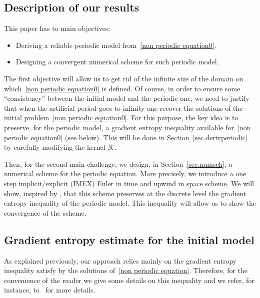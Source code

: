 \documentclass[11pt]{amsart}
\newcommand{\K}{\mathcal{K}}
\begin{document}
\subsection{Description of our results}\label{sec.description}

This paper has to main objectives:
\begin{itemize}
    \item Deriving a reliable periodic model from~\eqref{non periodic equation0}.
    \item Designing a convergent numerical scheme for such periodic model.
\end{itemize}
The first objective will allow us to get rid of the infinite size of the domain on which~\eqref{non periodic equation0} is defined. Of course, in order to ensure some ``consistency'' between the initial model and the periodic one, we need to justify that when the artificial period goes to infinity one recover the solutions of the initial problem~\eqref{non periodic equation0}. For this purpose, the key idea is to preserve, for the periodic model, a gradient entropy inequality available for~\eqref{non periodic equation0} (see below). This will be done in Section~\ref{sec.derivperiodic} by carefully modifying the kernel $\K$. 

Then, for the second main challenge, we design, in Section~\ref{sec.numsch}, a numerical scheme for the periodic equation. More precisely, we introduce a one step implicit/explicit (IMEX) Euler in time and upwind in space scheme. We will show, inspired by \cite{2}, that this scheme preserves at the discrete level the gradient entropy inequality of the periodic model. This inequality will allow us to show the convergence of the scheme.

\subsection{Gradient entropy estimate for the initial model}

As explained previously, our approach relies mainly on the gradient entropy inequality satisfy by the solutions of~\eqref{non periodic equation}. Therefore, for the convenience of the reader we give some details on this inequality and we refer, for instance, to~\cite{1} for more details.
\end{document}
